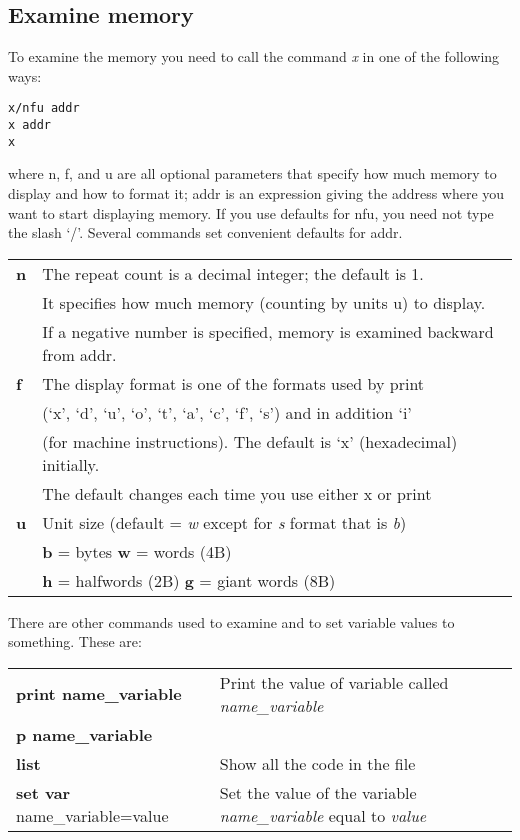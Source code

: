\subsection{Examine memory}
To examine the memory you need to call the command \textit{x} in one of the following ways:
\begin{lstlisting}[linewidth=60pt, basicstyle=\footnotesize\sffamily,]
x/nfu addr
x addr
x
\end{lstlisting}
where n, f, and u are all optional parameters that specify how much memory to display and how to format it; addr is an expression giving the address where you want to start displaying memory. If you use defaults for nfu, you need not type the slash ‘/’. Several commands set convenient defaults for addr.
\begin{table}[h]
\footnotesize\centering
\begin{tabular}{|l|l|}
\hline
{\textbf{n}} & {The repeat count is a decimal integer; the default is 1.}\\
{} & {It specifies how much memory (counting by units u) to display.}\\
{} & {If a negative number is specified, memory is examined backward from addr.}\\
\hline
{\textbf{f}} & {The display format is one of the formats used by print}\\
{} & {(‘x’, ‘d’, ‘u’, ‘o’, ‘t’, ‘a’, ‘c’, ‘f’, ‘s’) and in addition ‘i’}\\
{} & {(for machine instructions). The default is ‘x’ (hexadecimal) initially.}\\
{} & {The default changes each time you use either x or print}\\
\hline
{\textbf{u}} & {Unit size (default = \textit{w} except for \textit{s} format that is \textit{b})}\\
{} & {\textbf{b} = bytes                \textbf{w} = words (4B)}\\
{} & {\textbf{h} = halfwords (2B)       \textbf{g} = giant words (8B)}\\
\hline
\end{tabular}
\end{table}
There are other commands used to examine and to set variable values to something. These are:
\begin{table}[h]
\footnotesize\centering
\begin{tabular}{|l|l|}
\hline
{\textbf{print name\_variable}} & {Print the value of variable called \textit{name\_variable}}\\
{\textbf{p name\_variable}} & {}\\
\hline
{\textbf{list}}  & {Show all the code in the file}\\
\hline
{\textbf{set var} name\_variable=value} & {Set the value of the variable \textit{name\_variable} equal to \textit{value}}\\
\hline
\end{tabular}
\end{table}
